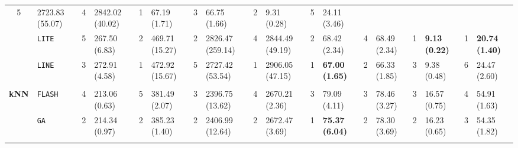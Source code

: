 \begin{tabular}{clllllllllllllllll}
  5 &
  \multicolumn{1}{l|}{2723.83 (55.07)} &
  4 &
  \multicolumn{1}{l|}{2842.02 (40.02)} &
  \cellcolor{blue!15}1 &
  \multicolumn{1}{l|}{\cellcolor{blue!15}67.19 (1.71)} &
  3 &
  \multicolumn{1}{l|}{66.75 (1.66)} &
  2 &
  \multicolumn{1}{l|}{9.31 (0.28)} &
  5 &
  24.11 (3.46) \\
\multicolumn{1}{c|}{} &
  \multicolumn{1}{l|}{\texttt{LITE}} &
  5 &
  \multicolumn{1}{l|}{267.50 (6.83)} &
  2 &
  \multicolumn{1}{l|}{469.71 (15.27)} &
  2 &
  \multicolumn{1}{l|}{2826.47 (259.14)} &
  4 &
  \multicolumn{1}{l|}{2844.49 (49.19)} &
  2 &
  \multicolumn{1}{l|}{68.42 (2.34)} &
  4 &
  \multicolumn{1}{l|}{68.49 (2.34)} &
  \cellcolor{blue!15}1 &
  \multicolumn{1}{l|}{\cellcolor{blue!15}\textbf{9.13 (0.22)}} &
  \cellcolor{blue!15}1 &
  \cellcolor{blue!15}\textbf{20.74 (1.40)} \\
\multicolumn{1}{c|}{} &
  \multicolumn{1}{l|}{\texttt{LINE}} &
  3 &
  \multicolumn{1}{l|}{272.91 (4.58)} &
  \cellcolor{blue!15}1 &
  \multicolumn{1}{l|}{\cellcolor{blue!15}472.92 (15.67)} &
  5 &
  \multicolumn{1}{l|}{2727.42 (53.54)} &
  \cellcolor{blue!15}1 &
  \multicolumn{1}{l|}{\cellcolor{blue!15}2906.05 (47.15)} &
  \cellcolor{blue!15}1 &
  \multicolumn{1}{l|}{\cellcolor{blue!15}\textbf{67.00 (1.65)}} &
  2 &
  \multicolumn{1}{l|}{66.33 (1.85)} &
  3 &
  \multicolumn{1}{l|}{9.38 (0.48)} &
  6 &
  24.47 (2.60) \\
\hline
\multicolumn{1}{l}{\textbf{}} &
    &
    &
    &
    &
    &
    &
    &
    &
    &
    &
    &
    &
    &
    &
    &
    &
    \\ \hline
\multicolumn{1}{c|}{\multirow{9}{*}{\textbf{kNN}}} &
  \multicolumn{1}{l|}{\texttt{FLASH}} &
  4 &
  \multicolumn{1}{l|}{213.06 (0.63)} &
  5 &
  \multicolumn{1}{l|}{381.49 (2.07)} &
  3 &
  \multicolumn{1}{l|}{2396.75 (13.62)} &
  4 &
  \multicolumn{1}{l|}{2670.21 (2.36)} &
  3 &
  \multicolumn{1}{l|}{79.09 (4.11)} &
  3 &
  \multicolumn{1}{l|}{78.46 (3.27)} &
  3 &
  \multicolumn{1}{l|}{16.57 (0.75)} &
  4 &
  54.91 (1.63) \\
\multicolumn{1}{c|}{} &
  \multicolumn{1}{l|}{\texttt{GA}} &
  2 &
  \multicolumn{1}{l|}{214.34 (0.97)} &
  2 &
  \multicolumn{1}{l|}{385.23 (1.40)} &
  2 &
  \multicolumn{1}{l|}{2406.99 (12.64)} &
  2 &
  \multicolumn{1}{l|}{2672.47 (3.69)} &
  \cellcolor{blue!15}1 &
  \multicolumn{1}{l|}{\cellcolor{blue!15}\textbf{75.37 (6.04)}} &
  2 &
  \multicolumn{1}{l|}{78.30 (3.69)} &
  2 &
  \multicolumn{1}{l|}{16.23 (0.65)} &
  3 &
  54.35 (1.82) \\
\multicolumn{1}{c|}{} &

\end{tabular}
